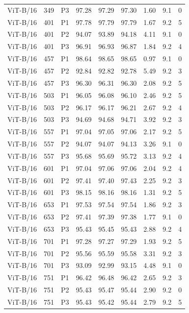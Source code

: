 {\begin{longtable}{lrlrrrrrr}
ViT-B/16 & 349 & P3 & 97.28 & 97.29 & 97.30 & 1.60 & 9.1 & 0 \\
ViT-B/16 & 401 & P1 & 97.78 & 97.79 & 97.79 & 1.67 & 9.2 & 5 \\
ViT-B/16 & 401 & P2 & 94.07 & 93.89 & 94.18 & 4.11 & 9.1 & 0 \\
ViT-B/16 & 401 & P3 & 96.91 & 96.93 & 96.87 & 1.84 & 9.2 & 4 \\
ViT-B/16 & 457 & P1 & 98.64 & 98.65 & 98.65 & 0.97 & 9.1 & 0 \\
ViT-B/16 & 457 & P2 & 92.84 & 92.82 & 92.78 & 5.49 & 9.2 & 3 \\
ViT-B/16 & 457 & P3 & 96.30 & 96.31 & 96.30 & 2.08 & 9.2 & 5 \\
ViT-B/16 & 503 & P1 & 96.05 & 96.08 & 96.10 & 2.46 & 9.2 & 5 \\
ViT-B/16 & 503 & P2 & 96.17 & 96.17 & 96.21 & 2.67 & 9.2 & 4 \\
ViT-B/16 & 503 & P3 & 94.69 & 94.68 & 94.71 & 3.92 & 9.2 & 3 \\
ViT-B/16 & 557 & P1 & 97.04 & 97.05 & 97.06 & 2.17 & 9.2 & 5 \\
ViT-B/16 & 557 & P2 & 94.07 & 94.07 & 94.13 & 3.26 & 9.1 & 0 \\
ViT-B/16 & 557 & P3 & 95.68 & 95.69 & 95.72 & 3.13 & 9.2 & 4 \\
ViT-B/16 & 601 & P1 & 97.04 & 97.06 & 97.06 & 2.04 & 9.2 & 4 \\
ViT-B/16 & 601 & P2 & 97.41 & 97.40 & 97.43 & 2.25 & 9.2 & 3 \\
ViT-B/16 & 601 & P3 & 98.15 & 98.16 & 98.16 & 1.31 & 9.2 & 5 \\
ViT-B/16 & 653 & P1 & 97.53 & 97.54 & 97.54 & 1.86 & 9.2 & 3 \\
ViT-B/16 & 653 & P2 & 97.41 & 97.39 & 97.38 & 1.77 & 9.1 & 0 \\
ViT-B/16 & 653 & P3 & 95.43 & 95.45 & 95.43 & 2.88 & 9.2 & 4 \\
ViT-B/16 & 701 & P1 & 97.28 & 97.27 & 97.29 & 1.93 & 9.2 & 5 \\
ViT-B/16 & 701 & P2 & 95.56 & 95.59 & 95.58 & 3.31 & 9.2 & 3 \\
ViT-B/16 & 701 & P3 & 93.09 & 92.99 & 93.15 & 4.48 & 9.1 & 0 \\
ViT-B/16 & 751 & P1 & 96.42 & 96.48 & 96.42 & 2.65 & 9.2 & 3 \\
ViT-B/16 & 751 & P2 & 95.43 & 95.47 & 95.44 & 2.90 & 9.2 & 0 \\
ViT-B/16 & 751 & P3 & 95.43 & 95.42 & 95.44 & 2.79 & 9.2 & 5 \\

\end{longtable}}
